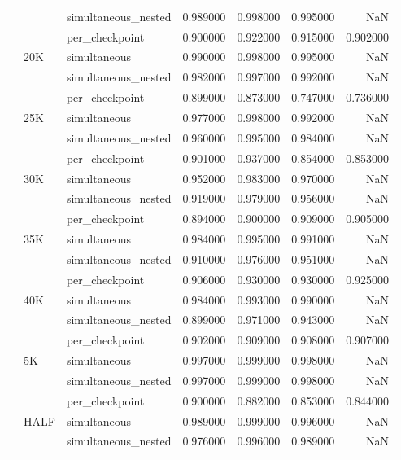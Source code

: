 \begin{tabular}{lllrrrr}
 &  & simultaneous\_nested & 0.989000 & 0.998000 & 0.995000 & NaN \\
\cline{2-7}
 & \multirow[t]{3}{*}{20K} & per\_checkpoint & 0.900000 & 0.922000 & 0.915000 & 0.902000 \\
 &  & simultaneous & 0.990000 & 0.998000 & 0.995000 & NaN \\
 &  & simultaneous\_nested & 0.982000 & 0.997000 & 0.992000 & NaN \\
\cline{2-7}
 & \multirow[t]{3}{*}{25K} & per\_checkpoint & 0.899000 & 0.873000 & 0.747000 & 0.736000 \\
 &  & simultaneous & 0.977000 & 0.998000 & 0.992000 & NaN \\
 &  & simultaneous\_nested & 0.960000 & 0.995000 & 0.984000 & NaN \\
\cline{2-7}
 & \multirow[t]{3}{*}{30K} & per\_checkpoint & 0.901000 & 0.937000 & 0.854000 & 0.853000 \\
 &  & simultaneous & 0.952000 & 0.983000 & 0.970000 & NaN \\
 &  & simultaneous\_nested & 0.919000 & 0.979000 & 0.956000 & NaN \\
\cline{2-7}
 & \multirow[t]{3}{*}{35K} & per\_checkpoint & 0.894000 & 0.900000 & 0.909000 & 0.905000 \\
 &  & simultaneous & 0.984000 & 0.995000 & 0.991000 & NaN \\
 &  & simultaneous\_nested & 0.910000 & 0.976000 & 0.951000 & NaN \\
\cline{2-7}
 & \multirow[t]{3}{*}{40K} & per\_checkpoint & 0.906000 & 0.930000 & 0.930000 & 0.925000 \\
 &  & simultaneous & 0.984000 & 0.993000 & 0.990000 & NaN \\
 &  & simultaneous\_nested & 0.899000 & 0.971000 & 0.943000 & NaN \\
\cline{2-7}
 & \multirow[t]{3}{*}{5K} & per\_checkpoint & 0.902000 & 0.909000 & 0.908000 & 0.907000 \\
 &  & simultaneous & 0.997000 & 0.999000 & 0.998000 & NaN \\
 &  & simultaneous\_nested & 0.997000 & 0.999000 & 0.998000 & NaN \\
\cline{2-7}
 & \multirow[t]{3}{*}{HALF} & per\_checkpoint & 0.900000 & 0.882000 & 0.853000 & 0.844000 \\
 &  & simultaneous & 0.989000 & 0.999000 & 0.996000 & NaN \\
 &  & simultaneous\_nested & 0.976000 & 0.996000 & 0.989000 & NaN \\
\cline{1-7} \cline{2-7}
\bottomrule
\end{tabular}
